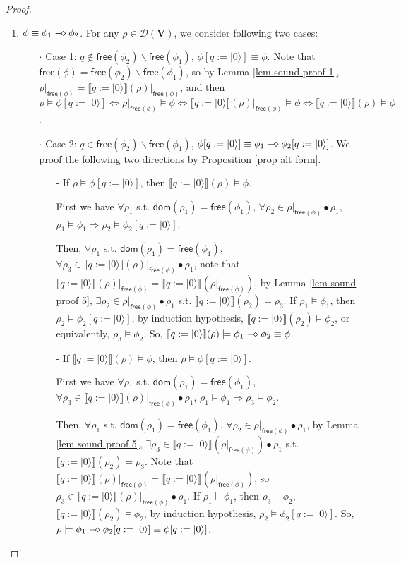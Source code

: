 \documentclass[conference,compsoc, 10pt]{IEEEtran}
\newcommand {\qI} {{q:=|0\rangle}}
\newcommand {\cD } {{\mathcal{D}}}
\newcommand {\dom }[1] {{\mathsf{dom}\!\left(#1\right)}}
\newcommand {\free }[1] {{\mathsf{free}\left(#1\right)}}
\newcommand {\rt }[2] {{\left.{#1}\right|_{#2}}}
\newcommand {\vars } {\mathbf{V}}
\newcommand {\sem}[1] {\llbracket#1\rrbracket}
\newcommand {\sdimp} {\mathrel{-\mkern-2.5mu\diamond}}
\begin{document}
\begin{appendices}
\begin{proof}
\begin{enumerate}
				
				\item $\phi \equiv \phi_1\sdimp\phi_2$. For any $\rho\in\cD(\vars)$, we consider following two cases:
				\begin{itemize}
					\item[$\cdot$] Case 1: $q\notin\free{\phi_2}\backslash\free{\phi_1}$, $\phi[\qI]\equiv\phi$. Note that $\free{\phi} = \free{\phi_2}\backslash\free{\phi_1}$, so by Lemma \ref{lem sound proof 1}, $\rt{\rho}{\free{\phi}} = \rt{\sem{\qI}(\rho)}{\free{\phi}}$, and then $\rho\models\phi[\qI]\Leftrightarrow\rt{\rho}{\free{\phi}}\models\phi\Leftrightarrow\rt{\sem{\qI}(\rho)}{\free{\phi}}\models\phi\Leftrightarrow\sem{\qI}(\rho)\models\phi$.
					\item[$\cdot$] Case 2: $q\in\free{\phi_2}\backslash\free{\phi_1}$, $\phi[\qI]\equiv\phi_1\sdimp\phi_2[\qI]$. We proof the following two directions by Proposition \ref{prop alt form}.
					\begin{itemize} 
						\item[-] If $\rho\models\phi[\qI]$, then $\sem{\qI}(\rho)\models\phi$. 
						
						First we have $\forall\rho_1$ s.t. $\dom{\rho_1}=\free{\phi_1}$, $\forall\rho_2\in\rt{\rho}{\free{\phi}}\bullet\rho_1$, $\rho_1\models\phi_1\Rightarrow\rho_2\models\phi_2[\qI]$. 
						
						Then, $\forall\rho_1$ s.t. $\dom{\rho_1}=\free{\phi_1}$, $\forall\rho_3\in\rt{\sem{\qI}(\rho)}{\free{\phi}}\bullet\rho_1$, note that $\rt{\sem{\qI}(\rho)}{\free{\phi}} = \sem{\qI}(\rt{\rho}{\free{\phi}})$, by Lemma \ref{lem sound proof 5}, $\exists\rho_2\in\rt{\rho}{\free{\phi}}\bullet\rho_1$ s.t. $\sem{\qI}(\rho_2) = \rho_3$. If $\rho_1\models\phi_1$, then $\rho_2\models\phi_2[\qI]$, by induction hypothesis, $\sem{\qI}(\rho_2)\models\phi_2$, or equivalently, $\rho_3\models\phi_2$. So, $\sem{\qI}(\rho)\models\phi_1\sdimp\phi_2\equiv\phi$.
						
						\item[-] If $\sem{\qI}(\rho)\models\phi$, then $\rho\models\phi[\qI]$. 
						
						First we have $\forall\rho_1$ s.t. $\dom{\rho_1}=\free{\phi_1}$, $\forall\rho_3\in\rt{\sem{\qI}(\rho)}{\free{\phi}}\bullet\rho_1$, $\rho_1\models\phi_1\Rightarrow\rho_3\models\phi_2$. 
						
						Then, $\forall\rho_1$ s.t. $\dom{\rho_1}=\free{\phi_1}$, $\forall\rho_2\in\rt{\rho}{\free{\phi}}\bullet\rho_1$, by Lemma \ref{lem sound proof 5}, $\exists\rho_3\in\sem{\qI}(\rt{\rho}{\free{\phi}})\bullet\rho_1$ s.t. $\sem{\qI}(\rho_2) = \rho_3$. Note that $\rt{\sem{\qI}(\rho)}{\free{\phi}} = \sem{\qI}(\rt{\rho}{\free{\phi}})$, so  $\rho_3\in\rt{\sem{\qI}(\rho)}{\free{\phi}}\bullet\rho_1$. If $\rho_1\models\phi_1$, then $\rho_3\models\phi_2$, $\sem{\qI}(\rho_2)\models\phi_2$, by induction hypothesis, $\rho_2\models\phi_2[\qI]$. So, $\rho\models\phi_1\sdimp\phi_2[\qI]\equiv\phi[\qI]$.
					\end{itemize}
				\end{itemize}
				

\end{enumerate}
\end{proof}
\end{appendices}
\end{document}
